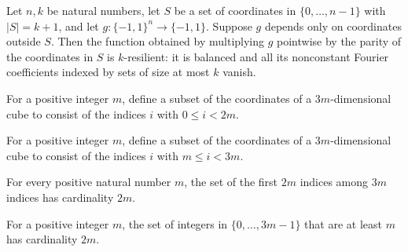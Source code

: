\begin{theorem}
\label{FABL.parityTimes_isResilient_of_dependsOn_compl}
\leanok
{}
Let $n,k$ be natural numbers, let $S$ be a set of coordinates in $\{0,\ldots,n-1\}$ with
$|S|=k+1$, and let $g:\{−1,1\}^n\to\{−1,1\}$. Suppose $g$ depends only on coordinates
outside $S$. Then the function obtained by multiplying $g$ pointwise by the parity of
the coordinates in $S$ is $k$-resilient: it is balanced and all its nonconstant Fourier
coefficients indexed by sets of size at most $k$ vanish.
\end{theorem}

\begin{definition}
\label{FABL.firstTwoThirds}
\leanok
For a positive integer $m$, define a subset of the coordinates of a $3m$-dimensional
cube to consist of the indices $i$ with $0\le i<2m$.
\end{definition}

\begin{definition}
\label{FABL.lastTwoThirds}
\leanok
For a positive integer $m$, define a subset of the coordinates of a $3m$-dimensional
cube to consist of the indices $i$ with $m\le i<3m$.
\end{definition}

\begin{theorem}
\label{FABL.card_firstTwoThirds}
\leanok
{}
For every positive natural number $m$, the set of the first $2m$ indices among $3m$
indices has cardinality $2m$.
\end{theorem}

\begin{theorem}
\label{FABL.card_lastTwoThirds}
\leanok
{}
For a positive integer $m$, the set of integers in $\{0,\ldots,3m-1\}$ that are at least
$m$ has cardinality $2m$.
\end{theorem}


